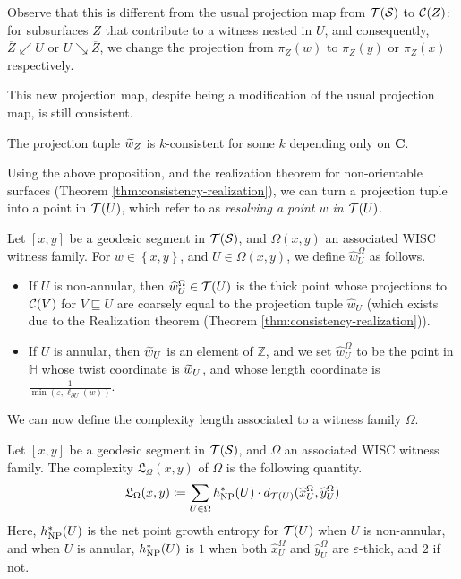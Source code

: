 \documentclass[12pt, reqno]{amsart}
\begin{document}
  Observe that this is different from the usual projection map from $\mathcal{T}(\mathcal{S})$ to $\mathcal{C}(Z)$: for subsurfaces $Z$ that contribute to a witness nested in $U$, and consequently, $\overline{Z} \swarrow U$ or $U \searrow \overline{Z}$, we change the projection from $\pi_Z(w)$ to $\pi_Z(y)$ or $\pi_Z(x)$ respectively.

  This new projection map, despite being a modification of the usual projection map, is still consistent.
  \begin{proposition}
    The projection tuple $\widetilde{w}_Z$ is $k$-consistent for some $k$ depending only on $\mathbf{C}$.
  \end{proposition}

  Using the above proposition, and the realization theorem for non-orientable surfaces (Theorem \ref{thm:consistency-realization}), we can turn a projection tuple into a point in $\mathcal{T}(U)$, which \textcite{dowdall2023lattice} refer to as \emph{resolving a point $w$ in $\mathcal{T}(U)$}.
  \begin{definition}
    Let $[x,y]$ be a geodesic segment in $\mathcal{T}(\mathcal{S})$, and $\Omega(x,y)$ an associated WISC witness family.
    For $w \in \left\{ x, y \right\}$, and $U \in \Omega(x,y)$, we define $\widehat{w}_U^{\Omega}$ as follows.
    \begin{itemize}
    \item If $U$ is non-annular, then $\widehat{w}_U^{\Omega} \in \mathcal{T}(U)$ is the thick point whose projections to $\mathcal{C}(V)$ for $V \sqsubseteq U$ are coarsely equal to the projection tuple $\widehat{w}_U$ (which exists due to the Realization theorem (Theorem \ref{thm:consistency-realization})).
    \item If $U$ is annular, then $\widetilde{w}_U$ is an element of $\mathbb{Z}$, and we set $\widehat{w}_U^{\Omega}$ to be the point in $\mathbb{H}$ whose twist coordinate is $\widetilde{w}_U$, and whose length coordinate is $\displaystyle \frac{1}{\min\left( \varepsilon, \ell_{\partial U}(w) \right)}$.
    \end{itemize}
  \end{definition}

  We can now define the complexity length associated to a witness family $\Omega$.

  \begin{definition}
    Let $[x, y]$ be a geodesic segment in $\mathcal{T}(\mathcal{S})$, and $\Omega$ an associated WISC witness family.
    The complexity $\mathfrak{L}_{\Omega}(x,y)$ of $\Omega$ is the following quantity.
    \begin{align*}
      \mathfrak{L}_{\Omega}(x,y) \coloneqq \sum_{U \in \Omega} h_{\mathrm{NP}}^{\ast}(U) \cdot d_{\mathcal{T}(U)}(\widehat{x}_{U}^{\Omega}, \widehat{y}_{U}^{\Omega})
    \end{align*}
    Here, $h_{\mathrm{NP}}^{\ast}(U)$ is the net point growth entropy for $\mathcal{T}(U)$ when $U$ is non-annular, and when $U$ is annular, $h_{\mathrm{NP}}^{\ast}(U)$ is $1$ when both $\widehat{x}_{U}^{\Omega}$ and $\widehat{y}_{U}^{\Omega}$ are $\varepsilon$-thick, and $2$ if not.
  \end{definition}
\end{document}
